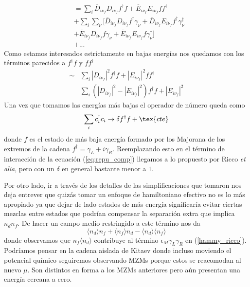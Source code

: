 \begin{equation}
    \begin{split}
        &=\sum_i \overline{D}_{i\nu_f} D_{i\nu_f} f^\dagger f + \overline{E}_{i\nu_f} E_{i\nu_f} f f^\dagger\\
        &+\sum_i\sum_\nu\Big[ \overline{D}_{i\nu_f}D_{i\nu_f} f^\dagger\gamma_\nu + \overline{D}_{i\nu_f} E_{i\nu_f} f^\dagger \gamma_\nu^\dagger\\
        &+\overline{E}_{i\nu_f} D_{i\nu_f} f\gamma_\nu + \overline{E}_{i\nu_f}E_{i\nu_f} f\gamma_\nu^\dagger \Big]\\
        &+...
    \end{split}
\end{equation}
Como estamos interesados estrictamente en bajas energ\'{i}as nos quedamos con los t\'{e}rminos parecidos a $f^\dagger f$ y $ff^\dagger$
\begin{equation}
\begin{split}
    \sim &\sum_i |D_{i\nu_f}|^2f^\dagger f+|E_{i\nu_f}|^2 f f^\dagger\\
    &\sum_i(|D_{i\nu_f}|^2-|E_{i\nu_f}|^2) f^\dagger f + |E_{i\nu_f}|^2
\end{split}
\end{equation}
Una vez que tomamos las energ\'{i}as m\'{a}s bajas el operador de n\'{u}mero queda como 
\begin{equation}
    \sum_i c^\dagger_i c_i \rightarrow \delta f^\dagger f + \tex{cte}
\end{equation}
donde $f$ es el estado de m\'{a}s baja energ\'{i}a formado por los Majorana de los extremos de la cadena $f^\dagger = \gamma_L+i\gamma_R$. Reemplazando esto en el t\'{e}rmino de interacci\'{o}n de la ecuaci\'{o}n (\ref{eq:repu_comp}) llegamos a lo propuesto por Ricco \emph{et alia}, pero con un $\delta$ en general bastante menor a $1$.

Por otro lado, ir a trav\'{e}s de los detalles de las simplificaciones que tomaron nos deja entrever que quiz\'{a}s tomar un enfoque de hamiltoniano efectivo no es lo m\'{a}s apropiado ya que dejar de lado estados de m\'{a}s energ\'{i}a significar\'{i}a evitar ciertas mezclas entre estados que podr\'{i}an compensar la separaci\'{o}n extra que implica $n_dn_f$. De hacer un campo medio restringido a este t\'{e}rmino nos da
\begin{equation}
    \langle n_d \rangle n_f+\langle n_f \rangle n_d -\langle n_d\rangle \langle n_f\rangle
\end{equation}
donde observamos que $n_f\langle n_d\rangle$ contribuye al t\'{e}rmino $\epsilon_M\gamma_L\gamma_R$ en (\ref{hammy_ricco}). Podr\'{i}amos pensar en la cadena aislada de Kitaev donde incluso moviendo el potencial qu\'{i}mico seguiremos observando MZMs porque estos se reacomodan al nuevo $\mu$. Son distintos en forma a los MZMs anteriores pero a\'{u}n presentan una energ\'{i}a cercana a cero. 

